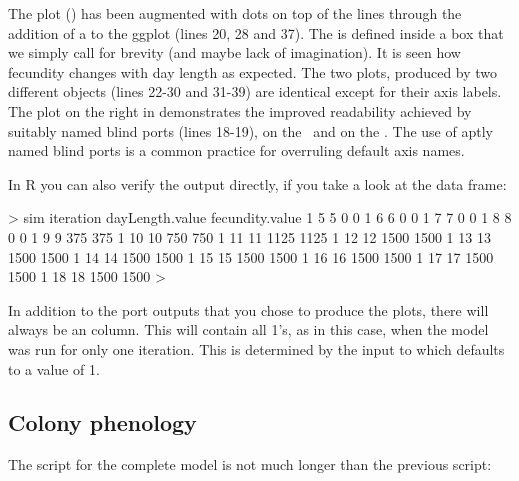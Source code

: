 The plot () has been augmented with dots on top of the lines through the addition of a  to the ggplot (lines 20, 28 and 37). The  is defined inside a box that we simply call  for brevity (and maybe lack of imagination). It is seen how fecundity changes with day length as expected. The two plots, produced by two different  objects (lines 22-30 and 31-39) are identical except for their axis labels. The plot on the right in  demonstrates the improved readability achieved by suitably named blind ports (lines 18-19),  on the \xaxis\ and  on the \yaxis. The use of aptly named blind ports is a common practice for overruling default axis names.

In R you can also verify the output directly, if you take a look at the  data frame:

\begin{rdialog}
> sim
iteration dayLength.value fecundity.value %
1     5         5      0          0
1     6         6      0          0
1     7         7      0          0
1     8         8      0          0
1     9         9    375        375
1    10        10    750        750
1    11        11   1125       1125
1    12        12   1500       1500
1    13        13   1500       1500
1    14        14   1500       1500
1    15        15   1500       1500
1    16        16   1500       1500
1    17        17   1500       1500
1    18        18   1500       1500
> 
\end{rdialog}

In addition to the port outputs that you chose to produce the plots, there will always be an  column. This will contain all 1's, as in this case, when the model was run for only one iteration. This is determined by the  input to  which defaults to a value of 1.

\subsection{Colony phenology}

The script for the complete model is not much longer than the previous script:

